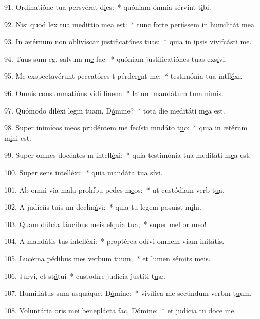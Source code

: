 91. Ordinatióne tua persvérat d\uline{i}es:~* quóniam ómnia sérvint t\uline{i}bi.\par 
92. Nisi quod lex tua medittio m\uline{e}a est:~* tunc forte periíssem in humilitát m\uline{e}a.\par 
93. In ætérnum non oblivíscar justificatónes t\uline{u}as:~* quia in ipsis vivifc\uline{á}sti me.\par 
94. Tuus sum eg, salvum m\uline{e} fac:~* quóniam justificatiónes tuas exs\uline{í}vi.\par 
95. Me exspectavérunt peccatóres t pérder\uline{e}nt me:~* testimónia tua intll\uline{é}xi.\par 
96. Omnis consummatións vidi f\uline{i}nem:~* latum mandátum tum n\uline{i}mis.\par 
97. Quómodo diléxi legm tuam, D\uline{ó}mine?~* tota die meditáti m\uline{e}a est.\par 
98. Super inimícos meos prudéntem me fecísti mndáto t\uline{u}o:~* quia in ætérnm m\uline{i}hi est.\par 
99. Super omnes docéntes m intell\uline{é}xi:~* quia testimónia tua meditáti m\uline{e}a est.\par 
100. Super sens intell\uline{é}xi:~* quia mandáta tua s\uline{í}vi.\par 
101. Ab omni via mala prohíbu pedes m\uline{e}os:~* ut custódiam verb t\uline{u}a.\par 
102. A judíciis tuis nn declin\uline{á}vi:~* quia tu legem posuíst m\uline{i}hi.\par 
103. Quam dúlcia fáucibus meis elquia t\uline{u}a,~* super mel or m\uline{e}o!\par 
104. A mandátis tus intell\uline{é}xi:~* proptérea odívi omnem viam init\uline{á}tis.\par 
105. Lucérna pédibus mes verbum t\uline{u}um,~* et lumen sémits m\uline{e}is.\par 
106. Jurvi, et st\uline{á}tui~* custodíre judícia justíti t\uline{u}æ.\par 
107. Humiliátus sum usquáque, D\uline{ó}mine:~* vivífica me secúndum verbm t\uline{u}um.\par 
108. Voluntária oris mei beneplácta fac, D\uline{ó}mine:~* et judícia tu d\uline{o}ce me.\par 
